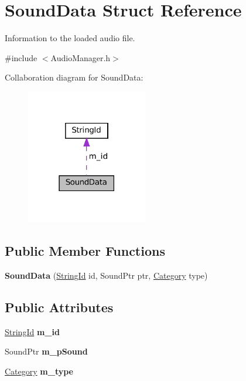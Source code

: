 \hypertarget{structSoundData}{}\section{Sound\+Data Struct Reference}
\label{structSoundData}


Information to the loaded audio file.  




{\ttfamily \#include $<$Audio\+Manager.\+h$>$}



Collaboration diagram for Sound\+Data\+:\nopagebreak
\begin{figure}[H]
\begin{center}
\leavevmode
\includegraphics[width=150pt]{structSoundData__coll__graph}
\end{center}
\end{figure}
\subsection*{Public Member Functions}
\begin{DoxyCompactItemize}
\item 
\mbox{\label{structSoundData_af90adabecb69295833e4feae3b89e620}} 
{\bfseries Sound\+Data} (\hyperlink{classStringId}{String\+Id} id, Sound\+Ptr ptr, \hyperlink{AudioTypes_8h_a9ca8f05608edcbf85ab6c2c85a439ccb}{Category} type)
\end{DoxyCompactItemize}
\subsection*{Public Attributes}
\begin{DoxyCompactItemize}
\item 
\mbox{\label{structSoundData_a9aeca3046bc4f50697a4ca557a374d6d}} 
\hyperlink{classStringId}{String\+Id} {\bfseries m\+\_\+id}
\item 
\mbox{\label{structSoundData_a2b517173ef6f66648568990c5faed0c6}} 
Sound\+Ptr {\bfseries m\+\_\+p\+Sound}
\item 
\mbox{\label{structSoundData_abe64ac7eeaf6aeaa57b0d26fd4b92df4}} 
\hyperlink{AudioTypes_8h_a9ca8f05608edcbf85ab6c2c85a439ccb}{Category} {\bfseries m\+\_\+type}
\end{DoxyCompactItemize}


